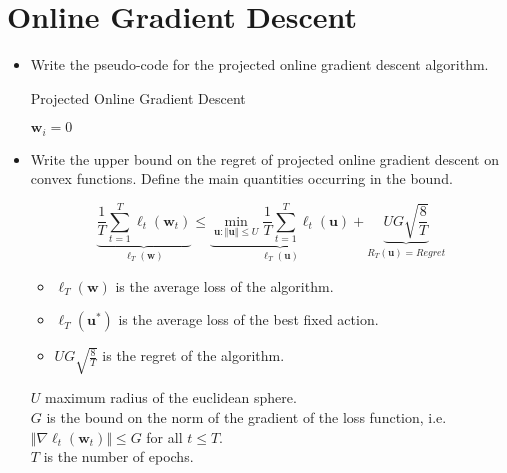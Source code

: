 \newpage
\section{Online Gradient Descent}

\begin{itemize}

    \item Write the pseudo-code for the projected online gradient descent algorithm. 

    \begin{algorithm}[H]
        \SetAlgoLined
        \DontPrintSemicolon
        \caption{Projected Online Gradient Descent}
        $\boldsymbol{w}_i = 0$\\
    \end{algorithm}

    \item Write the upper bound on the regret of projected online gradient descent on convex functions. Define the main quantities occurring in the bound.

        $$
        \underbrace{\frac{1}{T} \sum_{t=1}^{T} \ell_{t}(\boldsymbol{w}_{t})}_{\ell_T(\boldsymbol{w})} \leq \underbrace{\min_{\boldsymbol{u} : \Vert \boldsymbol{u} \Vert \leq U} \frac{1}{T} \sum_{t=1}^{T} \ell_{t}(\boldsymbol{u})}_{\ell_T(\boldsymbol{u})} + \underbrace{UG \sqrt{\frac{8}{T}}}_{R_T(\boldsymbol{u}) = Regret}
        $$

        \begin{itemize}
            \item $\ell_T(\boldsymbol{w})$ is the average loss of the algorithm.
            \item $\ell_T(\boldsymbol{u^*})$ is the average loss of the best fixed action.
            \item $UG \sqrt{\frac{8}{T}}$ is the regret of the algorithm.
        \end{itemize}
        
        $U$ maximum radius of the euclidean sphere.\\
        $G$ is the bound on the norm of the gradient of the loss function, i.e. $\Vert \nabla \ell_{t}(\boldsymbol{w}_{t}) \Vert \leq G$ for all $t \leq T$.\\
        $T$ is the number of epochs.\\


\end{itemize}
